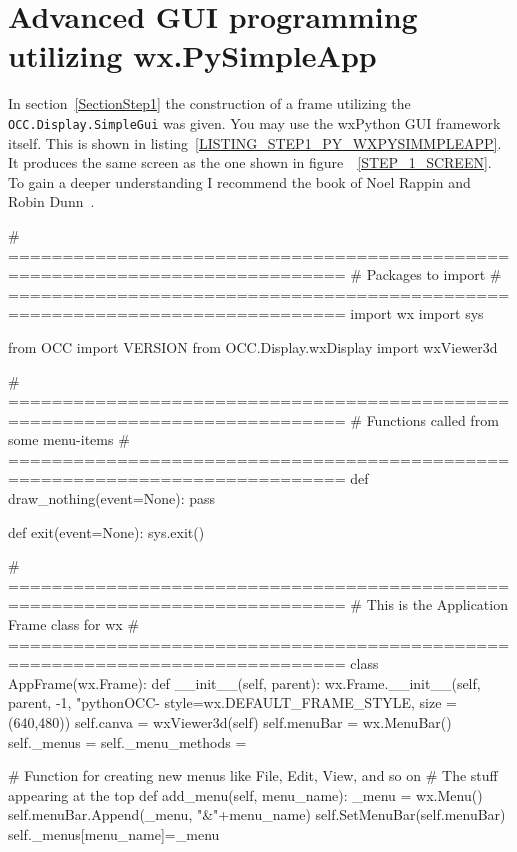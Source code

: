 \section{Advanced GUI programming utilizing wx.PySimpleApp}
\label{Appendix_wx_PySimpleApp}
In section~\ref{SectionStep1} the construction of a frame utilizing the {\tt OCC.Display.SimpleGui} was given.
You may use the wxPython GUI framework itself.
This is shown in listing~\ref{LISTING_STEP1_PY_WXPYSIMMPLEAPP}.
It produces the same screen as the one shown in figure~~\ref{STEP_1_SCREEN}.
To gain a deeper understanding I recommend the book of Noel Rappin and Robin Dunn~\cite{WXPYTHON_IN_ACTION}.

\begin{python}[moreemph={[4], 46, 48},caption={Step1.py - The program frame},label=LISTING_STEP1_PY_WXPYSIMMPLEAPP]
# =============================================================================
# Packages to import
# =============================================================================
import wx
import sys

from OCC import VERSION
from OCC.Display.wxDisplay import wxViewer3d

# =============================================================================
# Functions called from some menu-items
# =============================================================================
def draw_nothing(event=None):
    pass

def exit(event=None):
    sys.exit()

# =============================================================================
# This is the Application Frame class for wx
# =============================================================================
class AppFrame(wx.Frame):
    def __init__(self, parent):
        wx.Frame.__init__(self, 
                          parent, 
                          -1, 
                        "pythonOCC-%
                        style=wx.DEFAULT_FRAME_STYLE,
                        size = (640,480))
        self.canva = wxViewer3d(self)      
        self.menuBar = wx.MenuBar()
        self._menus = {}
        self._menu_methods = {}
    
    # Function for creating new menus like File, Edit, View, and so on
    # The stuff appearing at the top    
    def add_menu(self, menu_name):
        _menu = wx.Menu()
        self.menuBar.Append(_menu, "&"+menu_name)
        self.SetMenuBar(self.menuBar)
        self._menus[menu_name]=_menu


\end{python}
